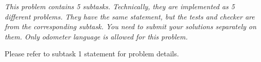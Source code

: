 {\it This problem contains 5 subtasks. Technically, they are implemented as 5 different problems. They have the same statement, but the tests and checker are from the corresponding subtask. You need to submit your solutions separately on them. Only odometer language is allowed for this problem. }

Please refer to subtask 1 statement for problem details. 